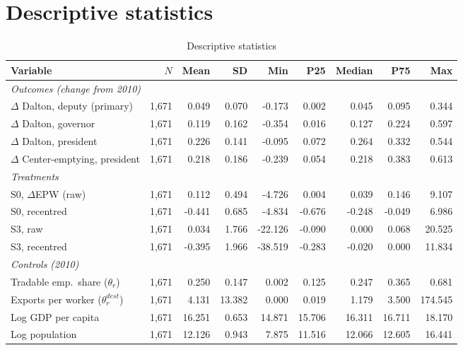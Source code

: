 \documentclass[
	11pt,				%
	oneside,			%
	a4paper,			%
	english,			%
	english				%
	]{abntex2ppgsi}
\theoremstyle{plain}
\theoremstyle{remark}
\theoremstyle{plain}%
\theoremstyle{remark}%
\begin{document}
\section{Descriptive statistics}

\begin{table}[!htbp]
\centering
\caption{Descriptive statistics}
\label{tab:desc_stats}
\begin{threeparttable}
\small
\setlength{\tabcolsep}{3pt}
\begin{tabular*}{\textwidth}{@{\extracolsep{\fill}}lrrrrrrrr@{}}
\toprule
Variable & $N$ & Mean & SD & Min & P25 & Median & P75 & Max \\
\midrule
\multicolumn{9}{l}{\textit{Outcomes (change from 2010)}} \\
$\Delta$ Dalton, deputy (primary) & 1,671 & 0.049 & 0.070 & -0.173 & 0.002 & 0.045 & 0.095 & 0.344 \\
$\Delta$ Dalton, governor        & 1,671 & 0.119 & 0.162 & -0.354 & 0.016 & 0.127 & 0.224 & 0.597 \\
$\Delta$ Dalton, president       & 1,671 & 0.226 & 0.141 & -0.095 & 0.072 & 0.264 & 0.332 & 0.544 \\
$\Delta$ Center-emptying, president & 1,671 & 0.218 & 0.186 & -0.239 & 0.054 & 0.218 & 0.383 & 0.613 \\
\midrule
\multicolumn{9}{l}{\textit{Treatments}} \\
S0, $\Delta$EPW (raw)            & 1,671 & 0.112 & 0.494 & -4.726 & 0.004 & 0.039 & 0.146 & 9.107 \\
S0, recentred                    & 1,671 & -0.441 & 0.685 & -4.834 & -0.676 & -0.248 & -0.049 & 6.986 \\
S3, raw    & 1,671 & 0.034 & 1.766 & -22.126 & -0.090 & 0.000 & 0.068 & 20.525 \\
S3, recentred & 1,671 & -0.395 & 1.966 & -38.519 & -0.283 & -0.020 & 0.000 & 11.834 \\
\midrule
\multicolumn{9}{l}{\textit{Controls (2010)}} \\
Tradable emp.\ share ($\theta_r$) & 1,671 & 0.250 & 0.147 & 0.002 & 0.125 & 0.247 & 0.365 & 0.681 \\
Exports per worker ($\theta^{dest}_r$) & 1,671 & 4.131 & 13.382 & 0.000 & 0.019 & 1.179 & 3.500 & 174.545 \\
Log GDP per capita             & 1,671 & 16.251 & 0.653 & 14.871 & 15.706 & 16.311 & 16.711 & 18.170 \\
Log population                 & 1,671 & 12.126 & 0.943 & 7.875  & 11.516 & 12.066 & 12.605 & 16.441 \\

\end{tabular*}
\end{threeparttable}
\end{table}
\end{document}
